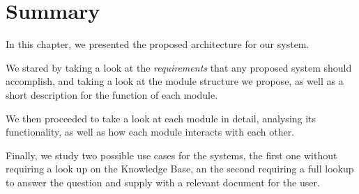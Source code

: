 % 

\section{Summary}

In this chapter, we presented the proposed architecture for our system.

We stared by taking a look at the \emph{requirements} that any proposed system should accomplish, and taking a look at the module structure we propose, as well as a short description for the function of each module.

We then proceeded to take a look at each module in detail, analysing its functionality, as well as how each module interacts with each other.

Finally, we study two possible use cases for the systems, the first one without requiring a look up on the Knowledge Base, an the second requiring a full lookup to answer the question and supply with a relevant document for the user.